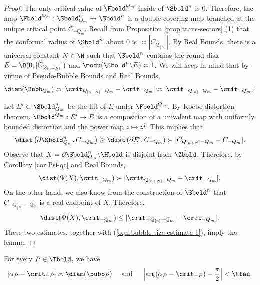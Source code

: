 \documentclass{amsart}
\begin{document}
\begin{proof}
    The only critical value of $\Fbold^{Q_m}$ inside of $\Sbold^n$ is $0$.
    Therefore, the map $\Fbold^{Q_m} : \Sbold^{n}_{Q_m} \to \Sbold^{n}$ is a double covering map branched at the unique critical point $C_{-Q_{m}}$.
    Recall from Proposition \ref{prop:trans-sectors} (1) that the conformal radius of $\Sbold^{n}$ about $0$ is $\asymp |C_{Q_{[n]}}|$.
    By Real Bounds, there is a universal constant $N \in \N$ such that $\Sbold^{n}$ contains the round disk $E = \D(0,|C_{Q_{[n+N]}}|)$ and $\modu(\Sbold^n \backslash E) \asymp 1$.
    We will keep in mind that by virtue of Pseudo-Bubble Bounds and Real Bounds,
    \begin{equation}
    \label{eqn:bubble-size-estimate-1}
        \diam(\Bubb_{Q_m}) \asymp |\crit_{Q_{[n+N]}-Q_m} - \crit_{-Q_m}| \asymp |\crit_{-Q_{[n]}-Q_m} - \crit_{-Q_m}|.
    \end{equation}
    
    Let $E' \subset \Sbold_{Q_m}^{n}$ be the lift of $E$ under $\Fbold^{Q_m}$.
    By Koebe distortion theorem, $\Fbold^{Q_m}: E' \to E$ is a composition of a univalent map with uniformly bounded distortion and the power map $z \mapsto z^2$.
    This implies that 
    \[
        \dist \left( \partial \Sbold^{n}_{Q_m}, C_{-Q_m} \right) \geq \dist\left( \partial E', C_{-Q_m} \right) \succ |C_{Q_{[n+N]} - Q_m} - C_{-Q_m}|.
    \]
    Observe that $X = \partial \Sbold^n_{Q_m} \backslash \Hbold$ is disjoint from $\hat{\Zbold}$.
    Therefore, by Corollary \ref{cor:Psi-qc} and Real Bounds,
    \[
        \dist ( \Psi(X), \crit_{-Q_m} ) \succ 
        |\crit_{Q_{[n+N]}-Q_m} - \crit_{-Q_m}|.
    \]
    On the other hand, we also know from the construction of $\Sbold^n$ that $C_{-Q_{[n]}-Q_m}$ is a real endpoint of $X$.
    Therefore,
    \[
        \dist ( \Psi(X), \crit_{-Q_m} ) \leq |\crit_{-Q_{[n]}-Q_m}-\crit_{-Q_m}|. 
    \]
    These two estimates, together with (\ref{eqn:bubble-size-estimate-1}), imply the lemma.
\end{proof}

\begin{corollary}
\label{cor:location-of-alpha}
    For every $P \in \Tbold$, we have
    \[
        |\alpha_P - \crit_{-P}| \asymp \diam(\Bubb_P) \quad \text{ and } \quad
        \left| \arg(\alpha_P-\crit_{-P}) - \frac{\pi}{2} \right| < \ttau.
    \]
\end{corollary}
\end{document}
